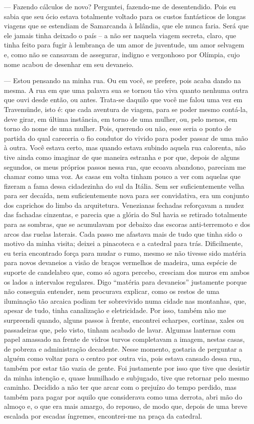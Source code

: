 --- Fazendo cálculos de novo? Perguntei, fazendo-me de desentendido. Pois
eu sabia que seu ócio estava totalmente voltado para os custos
fantásticos de longas viagens que se estendiam de Samarcanda à Islândia,
que ele nunca faria. Será que ele jamais tinha deixado o país -- a não
ser naquela viagem secreta, claro, que tinha feito para fugir à
lembrança de um amor de juventude, um amor selvagem e, como não se
cansavam de assegurar, indigno e vergonhoso por Olímpia, cujo nome
acabou de desenhar em seu devaneio.

--- Estou pensando na minha rua. Ou em você, se prefere, pois acaba dando
na mesma. A rua em que uma palavra sua se tornou tão viva quanto nenhuma
outra que ouvi desde então, ou antes. Trata-se daquilo que você me falou
uma vez em Travemünde, isto é: que cada aventura de viagem, para se
poder mesmo contá-la, deve girar, em última instância, em torno de uma
mulher, ou, pelo menos, em torno do nome de uma mulher. Pois, querendo
ou não, esse seria o ponto de partida do qual careceria o fio condutor
do vivido para poder passar de uma mão à outra. Você estava certo, mas
quando estava subindo aquela rua calorenta, não tive ainda como imaginar
de que maneira estranha e por que, depois de alguns segundos, os meus
próprios passos nessa rua, que ecoava abandono, pareciam me chamar como
uma voz. As casas em volta tinham pouco a ver com aquelas que fizeram a
fama dessa cidadezinha do sul da Itália. Sem ser suficientemente velha
para ser decaída, nem suficientemente nova para ser convidativa, era um
conjunto dos caprichos do limbo da arquitetura. Venezianas fechadas
reforçavam a mudez das fachadas cinzentas, e parecia que a glória do Sul
havia se retirado totalmente para as sombras, que se acumulavam por
debaixo das escoras anti-terremoto e dos arcos das ruelas laterais. Cada
passo me afastava mais de tudo que tinha sido o motivo da minha visita;
deixei a pinacoteca e a catedral para trás. Dificilmente, eu teria
encontrado força para mudar o rumo, mesmo se não tivesse sido matéria
para novos devaneios a visão de braços vermelhos de madeira, uma espécie
de suporte de candelabro que, como só agora percebo, cresciam dos muros
em ambos os lados a intervalos regulares. Digo ``matéria para
devaneios'' justamente porque não conseguia entender, nem procurava
explicar, como os restos de uma iluminação tão arcaica podiam ter
sobrevivido numa cidade nas montanhas, que, apesar de tudo, tinha
canalização e eletricidade. Por isso, também não me surpreendi quando,
alguns passos à frente, encontrei echarpes, cortinas, xales ou
passadeiras que, pelo visto, tinham acabado de lavar. Algumas lanternas
com papel amassado na frente de vidros turvos completavam a imagem,
nestas casas, de pobreza e administração decadente. Nesse momento,
gostaria de perguntar a alguém como voltar para o centro por outra via,
pois estava cansado dessa rua, também por estar tão vazia de gente. Foi
justamente por isso que tive que desistir da minha intenção e, quase
humilhado e subjugado, tive que retornar pelo mesmo caminho. Decidido a
não ter que arcar com o prejuízo do tempo perdido, mas também para pagar
por aquilo que considerava como uma derrota, abri mão do almoço e, o que
era mais amargo, do repouso, de modo que, depois de uma breve escalada
por escadas íngremes, encontrei-me na praça da catedral.

